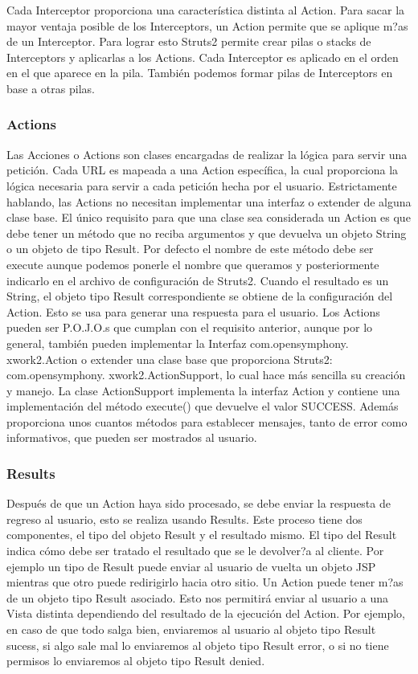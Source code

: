 \documentclass[12pt,a4paper,spanish]{book} %
\begin{document}
Cada Interceptor proporciona una característica distinta al Action. Para sacar la mayor ventaja posible de los Interceptors, un Action permite que se aplique m?as de un Interceptor. Para lograr esto Struts2 permite crear pilas o stacks de Interceptors y aplicarlas a los Actions. Cada Interceptor es aplicado en el orden en el que aparece en la pila. También podemos formar pilas de Interceptors en base a otras pilas.

\subsubsection{Actions}

Las Acciones o Actions son clases encargadas de realizar la lógica para servir una petición. Cada URL es mapeada a una Action específica, la cual proporciona la lógica necesaria para servir a cada petición hecha por el usuario. Estrictamente hablando, las Actions no necesitan implementar una interfaz o extender de alguna clase base. El único requisito para que una clase sea considerada un Action es que debe tener un método que no reciba argumentos y que devuelva un objeto String o un objeto de tipo Result. Por defecto el nombre de este método debe ser execute aunque podemos ponerle el nombre que queramos y posteriormente indicarlo en el archivo de configuración de Struts2.
Cuando el resultado es un String, el objeto tipo Result correspondiente se obtiene de la configuración del Action. Esto se usa para generar una respuesta para el usuario.
Los Actions pueden ser P.O.J.O.s que cumplan con el requisito anterior, aunque por lo general, también pueden implementar la Interfaz com.opensymphony. xwork2.Action o extender una clase base que proporciona Struts2: com.opensymphony. xwork2.ActionSupport, lo cual hace más sencilla su creación y manejo.
La clase ActionSupport implementa la interfaz Action y contiene una implementación del método execute() que devuelve el valor SUCCESS. Además proporciona unos cuantos métodos para establecer mensajes, tanto de error como informativos, que pueden ser mostrados al usuario.

\subsubsection{Results}

Después de que un Action haya sido procesado, se debe enviar la respuesta de regreso al usuario, esto se realiza usando Results. Este proceso tiene dos componentes, el tipo del objeto Result y el resultado mismo.
El tipo del Result indica cómo debe ser tratado el resultado que se le devolver?a al cliente. Por ejemplo un tipo de Result puede enviar al usuario de vuelta un objeto JSP mientras que otro puede redirigirlo hacia otro sitio.
Un Action puede tener m?as de un objeto tipo Result asociado. Esto nos permitirá enviar al usuario a una Vista distinta dependiendo del resultado de la ejecución del Action. Por ejemplo, en caso de que todo salga bien, enviaremos al usuario al objeto tipo Result sucess, si algo sale mal lo enviaremos al objeto tipo Result error, o si no tiene permisos lo enviaremos al objeto tipo Result denied.
\end{document}
